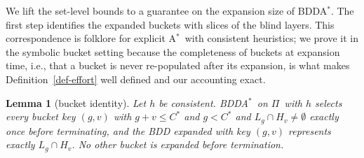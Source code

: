\documentclass[letterpaper]{article}
\newcommand{\task}{\ensuremath{\Pi}}
\newcommand{\copt}{\ensuremath{C^{*}}}
\newcommand{\level}[2]{\ensuremath{H_{#2}}}
\newcommand{\bddastar}{BDDA\ensuremath{^{*}}}
\newcommand{\astar}{A\ensuremath{^{*}}}
\theoremstyle{plain}
\newtheorem{lemma}{Lemma}
\theoremstyle{definition}
\theoremstyle{remark}
\begin{document}
We lift the set-level bounds to a guarantee on the expansion size of
\bddastar. The first step identifies the expanded buckets with slices of
the blind layers. This correspondence is folklore for explicit \astar\
with consistent heuristics; we prove it in the symbolic bucket setting
because the completeness of buckets at expansion time, i.e., that a
bucket is never re-populated after its expansion, is what makes
Definition~\ref{def-effort} well defined and our accounting exact.

\begin{lemma}[bucket identity]
\label{lem-identity}
Let $h$ be consistent. \bddastar\ on \task\ with $h$ selects every
bucket key $(g,v)$ with $g + v \leq \copt$ and $g < \copt$ and
$L_g \cap \level{h}{v} \neq \emptyset$ exactly once before terminating,
and the BDD expanded with key $(g,v)$ represents exactly
$L_g \cap \level{h}{v}$. No other bucket is expanded before
termination.
\end{lemma}
\end{document}
